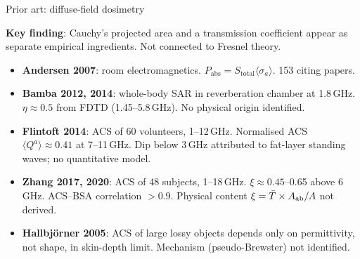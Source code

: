 \begin{frame}[label=app-lit-diffuse]{Prior art: diffuse-field dosimetry}

  \textbf{Key finding}: Cauchy's projected area and a transmission coefficient appear as separate empirical ingredients. Not connected to Fresnel theory.

  \vspace{6pt}
  {\small
  \begin{itemize}
    \item \textbf{Andersen 2007}: room electromagnetics. $P_{\mathrm{abs}} = S_{\mathrm{total}} \langle\sigma_a\rangle$. 153 citing papers.
    \item \textbf{Bamba 2012, 2014}: whole-body SAR in reverberation chamber at 1.8\,GHz. $\eta \approx 0.5$ from FDTD (1.45--5.8\,GHz). No physical origin identified.
    \item \textbf{Flintoft 2014}: ACS of 60 volunteers, 1--12\,GHz. Normalised ACS $\langle Q^a\rangle \approx 0.41$ at 7--11\,GHz. Dip below 3\,GHz attributed to fat-layer standing waves; no quantitative model.
    \item \textbf{Zhang 2017, 2020}: ACS of 48 subjects, 1--18\,GHz. $\xi \approx 0.45$--0.65 above 6\,GHz. ACS--BSA correlation $> 0.9$. Physical content $\xi = \bar{T} \times A_{\mathrm{ab}}/A$ not derived.
    \item \textbf{Hallbj\"orner 2005}: ACS of large lossy objects depends only on permittivity, not shape, in skin-depth limit. Mechanism (pseudo-Brewster) not identified.
  \end{itemize}
  }

  \vspace{4pt}
\end{frame}

